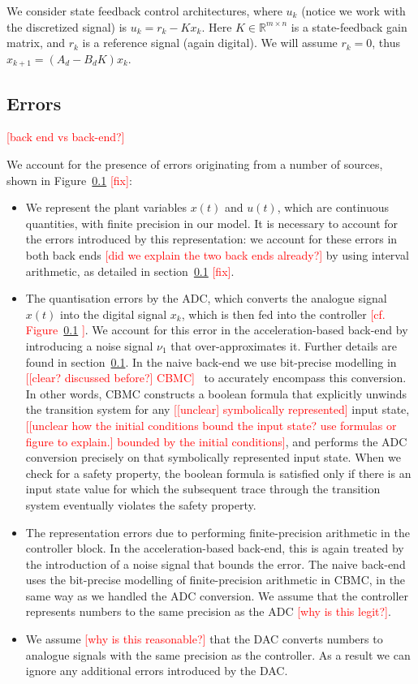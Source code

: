\documentclass[twocolumn]{autart}    %
\newcommand{\mat}[1]{{#1}}
\renewcommand{\vec}[1]{{#1}}
\renewcommand{\note}[1]{\textcolor{red}{[#1]}}
\begin{document}
We consider state feedback control architectures, 
where $u_k$ (notice we work with the discretized signal) is $u_k = r_{k} - K x_k$. 
Here $K \in \mathbb{R}^{m \times n}$ is a state-feedback gain matrix, 
and $r_{k}$ is a reference signal (again digital). 
We will assume $r_k=0$, thus 
$\vec{x}_{k+1}=(\mat{A}_d-\mat{B}_d\mat{K})\vec{x}_k$. 

\subsection{Errors}

\note{back end vs back-end?} 

We account for the presence of errors originating from a number of sources, shown in Figure~\ref{} \note{fix}:
\begin{itemize}
\item We represent the plant variables $x(t)$ and $u(t)$, which are continuous quantities, with finite precision in our model. 
It is necessary to account for the errors introduced by this representation: 
we account for these errors in both back ends \note{did we explain the two back ends already?} by using interval arithmetic, as detailed in section~\ref{} \note{fix}. 
\item The quantisation errors by the ADC, which converts the analogue signal $x(t)$ into the digital signal $x_k$, 
which is then fed into the controller \note{cf. Figure~\ref{} }. 
We account for this error in the acceleration-based back-end by introducing a noise signal $\nu_1$ that over-approximates it. Further details are found in section~\ref{}.  
In the naive back-end we use bit-precise modelling in \note{[clear? discussed before?] CBMC}~\cite{} to accurately encompass this conversion.   
In other words, CBMC constructs a boolean formula that explicitly unwinds the transition system for any \note{[unclear] symbolically represented} input state, 
\note{[unclear how the initial conditions bound the input state? use formulas or figure to explain.] bounded by the initial conditions}, 
and performs the ADC conversion precisely on that symbolically represented input state. 
When we check for a safety property, 
the boolean formula is satisfied only if there is an input state value for which the subsequent trace through the transition system eventually violates the safety property.  
\item The representation errors due to performing finite-precision arithmetic in the controller block. 
In the acceleration-based back-end, 
this is again treated by the introduction of a noise signal that bounds the error. 
The naive back-end uses the bit-precise modelling of finite-precision arithmetic in CBMC, 
in the same way as we handled the ADC conversion. 
We assume that the controller represents numbers to the same precision as the ADC \note{why is this legit?}. 
\item We assume \note{why is this reasonable?} that the DAC converts numbers to analogue signals with the same precision as the controller. 
As a result we can ignore any additional errors introduced by the DAC.  
\end{itemize}
\end{document}
